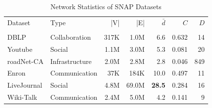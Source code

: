\begin{table}[!t]
\centering
\caption{Network Statistics of SNAP Datasets}
\label{tab:datasets}
\centering
\begin{tabular}{l l r r r r r}
\toprule
\toprule
    Dataset &           Type &  |V| &   |E| &     $\bar{d}$ &   $C$ &  $D$ \\ \\
\midrule
\midrule
       DBLP &  Collaboration & 317K &  1.0M &           6.6 & 0.632 &   14 \\
    Youtube &         Social & 1.1M &  3.0M &           5.3 & 0.081 &   20 \\
 roadNet-CA & Infrastructure & 2.0M &  2.8M &           2.8 & 0.046 &  849 \\
      Enron &  Communication &  37K &  184K &          10.0 & 0.497 &   11 \\
LiveJournal &         Social & 4.8M & 69.0M & \textbf{28.5} & 0.284 &   16 \\
  Wiki-Talk &  Communication & 2.4M &  5.0M &           4.2 & 0.141 &    9 \\
\bottomrule
\bottomrule
\end{tabular}
\end{table}